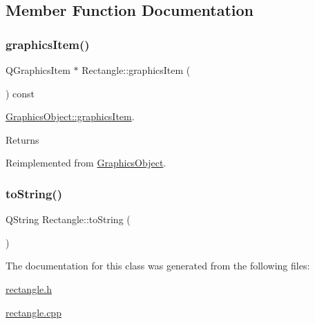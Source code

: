 \subsection{Member Function Documentation}
\mbox{\label{class_rectangle_a6d2cdec338bb43ad533b98e58eea9e03}} 
\subsubsection{\texorpdfstring{graphics\+Item()}{graphicsItem()}}
{\footnotesize\ttfamily Q\+Graphics\+Item $\ast$ Rectangle\+::graphics\+Item (\begin{DoxyParamCaption}{ }\end{DoxyParamCaption}) const\hspace{0.3cm}{\ttfamily [virtual]}}



\hyperlink{class_graphics_object_abd625951730f006e748570bf00d158bf}{Graphics\+Object\+::graphics\+Item}. 

\begin{DoxyReturn}{Returns}

\end{DoxyReturn}


Reimplemented from \hyperlink{class_graphics_object_abd625951730f006e748570bf00d158bf}{Graphics\+Object}.

\mbox{\label{class_rectangle_a75b1e77ef828ff8de86cfcf6b03bfadb}} 
\subsubsection{\texorpdfstring{to\+String()}{toString()}}
{\footnotesize\ttfamily Q\+String Rectangle\+::to\+String (\begin{DoxyParamCaption}{ }\end{DoxyParamCaption})}



The documentation for this class was generated from the following files\+:\begin{DoxyCompactItemize}
\item 
\hyperlink{rectangle_8h}{rectangle.\+h}\item 
\hyperlink{rectangle_8cpp}{rectangle.\+cpp}\end{DoxyCompactItemize}
